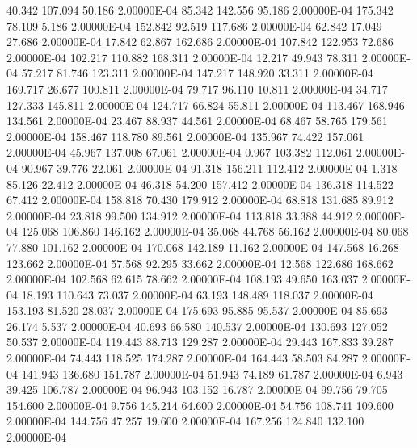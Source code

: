     40.342   107.094    50.186  2.00000E-04
    85.342   142.556    95.186  2.00000E-04
   175.342    78.109     5.186  2.00000E-04
   152.842    92.519   117.686  2.00000E-04
    62.842    17.049    27.686  2.00000E-04
    17.842    62.867   162.686  2.00000E-04
   107.842   122.953    72.686  2.00000E-04
   102.217   110.882   168.311  2.00000E-04
    12.217    49.943    78.311  2.00000E-04
    57.217    81.746   123.311  2.00000E-04
   147.217   148.920    33.311  2.00000E-04
   169.717    26.677   100.811  2.00000E-04
    79.717    96.110    10.811  2.00000E-04
    34.717   127.333   145.811  2.00000E-04
   124.717    66.824    55.811  2.00000E-04
   113.467   168.946   134.561  2.00000E-04
    23.467    88.937    44.561  2.00000E-04
    68.467    58.765   179.561  2.00000E-04
   158.467   118.780    89.561  2.00000E-04
   135.967    74.422   157.061  2.00000E-04
    45.967   137.008    67.061  2.00000E-04
     0.967   103.382   112.061  2.00000E-04
    90.967    39.776    22.061  2.00000E-04
    91.318   156.211   112.412  2.00000E-04
     1.318    85.126    22.412  2.00000E-04
    46.318    54.200   157.412  2.00000E-04
   136.318   114.522    67.412  2.00000E-04
   158.818    70.430   179.912  2.00000E-04
    68.818   131.685    89.912  2.00000E-04
    23.818    99.500   134.912  2.00000E-04
   113.818    33.388    44.912  2.00000E-04
   125.068   106.860   146.162  2.00000E-04
    35.068    44.768    56.162  2.00000E-04
    80.068    77.880   101.162  2.00000E-04
   170.068   142.189    11.162  2.00000E-04
   147.568    16.268   123.662  2.00000E-04
    57.568    92.295    33.662  2.00000E-04
    12.568   122.686   168.662  2.00000E-04
   102.568    62.615    78.662  2.00000E-04
   108.193    49.650   163.037  2.00000E-04
    18.193   110.643    73.037  2.00000E-04
    63.193   148.489   118.037  2.00000E-04
   153.193    81.520    28.037  2.00000E-04
   175.693    95.885    95.537  2.00000E-04
    85.693    26.174     5.537  2.00000E-04
    40.693    66.580   140.537  2.00000E-04
   130.693   127.052    50.537  2.00000E-04
   119.443    88.713   129.287  2.00000E-04
    29.443   167.833    39.287  2.00000E-04
    74.443   118.525   174.287  2.00000E-04
   164.443    58.503    84.287  2.00000E-04
   141.943   136.680   151.787  2.00000E-04
    51.943    74.189    61.787  2.00000E-04
     6.943    39.425   106.787  2.00000E-04
    96.943   103.152    16.787  2.00000E-04
    99.756    79.705   154.600  2.00000E-04
     9.756   145.214    64.600  2.00000E-04
    54.756   108.741   109.600  2.00000E-04
   144.756    47.257    19.600  2.00000E-04
   167.256   124.840   132.100  2.00000E-04
